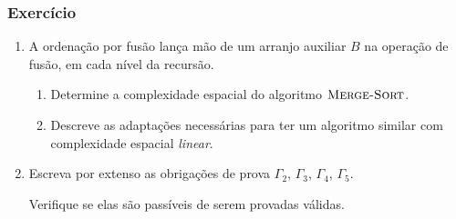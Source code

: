 \documentclass{beamer}
\begin{document}
\begin{frame}
\end{frame}

\begin{frame}

  \frametitle{Exercício}

  \begin{enumerate}
  \item A ordenação por fusão lança mão de um arranjo auxiliar $B$ na
    operação de fusão, em cada nível da recursão.
    \begin{enumerate}
      
    \item Determine a complexidade espacial do algoritmo $\textnormal{\scshape Merge-Sort}$.
    
    \item Descreve as adaptações necessárias para ter um algoritmo
      similar com complexidade espacial \emph{linear}.

    \end{enumerate}

  \item Escreva por extenso as obrigações de prova $\Gamma_2$, 
    $\Gamma_3$, $\Gamma_4$, $\Gamma_5$.

    Verifique se elas são passíveis de serem provadas válidas.
  \end{enumerate}
\end{frame}
\end{document}
